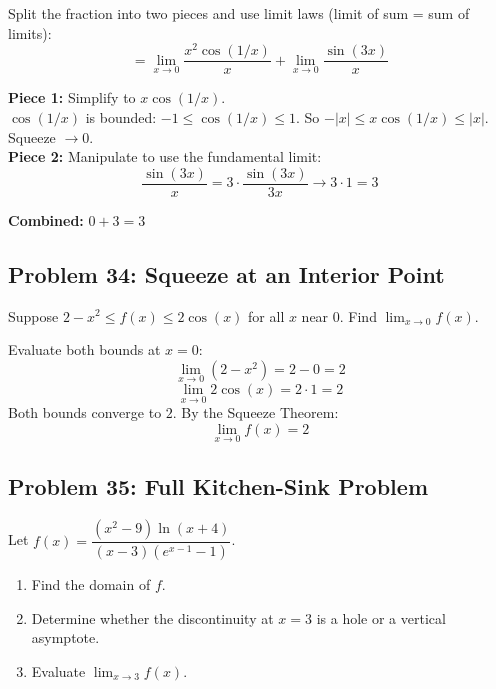 \documentclass[11pt, letterpaper]{article}
\begin{document}
\begin{tcolorbox}[colback=examplebg, colframe=exampleborder,
  title={\bfseries Solution}, arc=3pt, boxrule=1pt]
Split the fraction into two pieces and use limit laws (limit of sum = sum of limits):
\[
= \lim_{x \to 0} \frac{x^2 \cos(1/x)}{x} + \lim_{x \to 0} \frac{\sin(3x)}{x}
\]

\textbf{Piece 1:} Simplify to $x \cos(1/x)$.\\
$\cos(1/x)$ is bounded: $-1 \leq \cos(1/x) \leq 1$. So $-|x| \leq x\cos(1/x) \leq |x|$. Squeeze $\to 0$.\\[3pt]

\textbf{Piece 2:} Manipulate to use the fundamental limit:
\[
\frac{\sin(3x)}{x} = 3 \cdot \frac{\sin(3x)}{3x} \to 3 \cdot 1 = 3
\]

\textbf{Combined:} $0 + 3 = \boxed{3}$
\end{tcolorbox}

\subsection*{Problem 34: Squeeze at an Interior Point}

Suppose $2 - x^2 \leq f(x) \leq 2\cos(x)$ for all $x$ near $0$. Find $\displaystyle \lim_{x \to 0} f(x)$.

\begin{tcolorbox}[colback=examplebg, colframe=exampleborder,
  title={\bfseries Solution}, arc=3pt, boxrule=1pt]
Evaluate both bounds at $x = 0$:
\[
\lim_{x \to 0}(2 - x^2) = 2 - 0 = 2
\]
\[
\lim_{x \to 0} 2\cos(x) = 2 \cdot 1 = 2
\]
Both bounds converge to $2$. By the Squeeze Theorem:
\[
\lim_{x \to 0} f(x) = 2
\]
\end{tcolorbox}

\subsection*{Problem 35: Full Kitchen-Sink Problem}

Let $f(x) = \dfrac{(x^2 - 9)\ln(x + 4)}{(x - 3)(e^{x-1} - 1)}$.
\begin{enumerate}[noitemsep, label=(\alph*)]
  \item Find the domain of $f$.
  \item Determine whether the discontinuity at $x = 3$ is a hole or a vertical asymptote.
  \item Evaluate $\displaystyle \lim_{x \to 3} f(x)$.
\end{enumerate}
\end{document}
